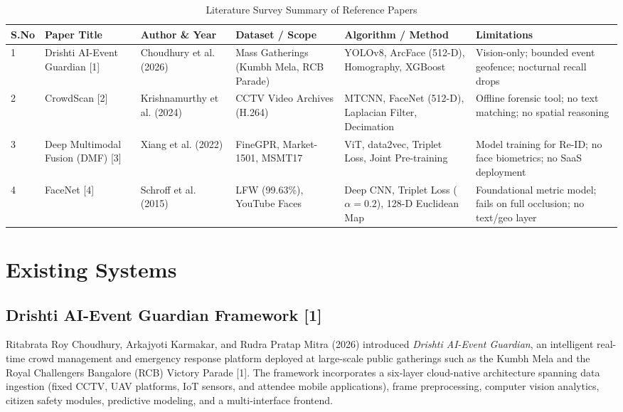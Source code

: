 \documentclass[12pt,a4paper]{report}
\begin{document}
\begin{table}[H]
\centering
\caption{Literature Survey Summary of Reference Papers}
\label{tab:lit_survey}
\small
\begin{tabularx}{\textwidth}{p{0.3in}p{1.2in}p{0.8in}p{1.2in}p{1.4in}p{1.1in}}
\toprule
\textbf{S.No} & \textbf{Paper Title} & \textbf{Author \& Year} & \textbf{Dataset / Scope} & \textbf{Algorithm / Method} & \textbf{Limitations} \\
\midrule
1 & Drishti AI-Event Guardian [1] & Choudhury et al. (2026) & Mass Gatherings (Kumbh Mela, RCB Parade) & YOLOv8, ArcFace (512-D), Homography, XGBoost & Vision-only; bounded event geofence; nocturnal recall drops \\
2 & CrowdScan [2] & Krishnamurthy et al. (2024) & CCTV Video Archives (H.264) & MTCNN, FaceNet (512-D), Laplacian Filter, Decimation & Offline forensic tool; no text matching; no spatial reasoning \\
3 & Deep Multimodal Fusion (DMF) [3] & Xiang et al. (2022) & FineGPR, Market-1501, MSMT17 & ViT, data2vec, Triplet Loss, Joint Pre-training & Model training for Re-ID; no face biometrics; no SaaS deployment \\
4 & FaceNet [4] & Schroff et al. (2015) & LFW (99.63\%), YouTube Faces & Deep CNN, Triplet Loss ($\alpha=0.2$), 128-D Euclidean Map & Foundational metric model; fails on full occlusion; no text/geo layer \\
\bottomrule
\end{tabularx}
\end{table}

\section{Existing Systems}

\subsection{Drishti AI-Event Guardian Framework [1]}
Ritabrata Roy Choudhury, Arkajyoti Karmakar, and Rudra Pratap Mitra (2026) introduced \textit{Drishti AI-Event Guardian}, an intelligent real-time crowd management and emergency response platform deployed at large-scale public gatherings such as the Kumbh Mela and the Royal Challengers Bangalore (RCB) Victory Parade [1]. The framework incorporates a six-layer cloud-native architecture spanning data ingestion (fixed CCTV, UAV platforms, IoT sensors, and attendee mobile applications), frame preprocessing, computer vision analytics, citizen safety modules, predictive modeling, and a multi-interface frontend.
\end{document}
